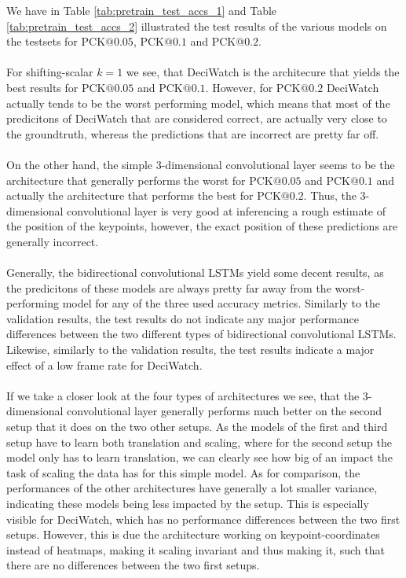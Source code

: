 \documentclass[./main.tex]{subfiles}
\begin{document}
\noindent We have in Table \ref{tab:pretrain_test_accs_1} and Table \ref{tab:pretrain_test_accs_2} illustrated the test results of the various models on the testsets for PCK$@0.05$, PCK$@0.1$ and PCK$@0.2$.
\\
\\
For shifting-scalar $k = 1$ we see, that DeciWatch is the architecure that yields the best results for PCK$@0.05$ and PCK$@0.1$. However, for PCK$@0.2$ DeciWatch actually tends to be the worst performing model, which means that most of the predicitons of DeciWatch that are considered correct, are actually very close to the groundtruth, whereas the predictions that are incorrect are pretty far off.
\\
\\
On the other hand, the simple 3-dimensional convolutional layer seems to be the architecture that generally performs the worst for PCK$@0.05$ and PCK$@0.1$ and actually the architecture that performs the best for PCK$@0.2$. Thus, the 3-dimensional convolutional layer is very good at inferencing a rough estimate of the position of the keypoints, however, the exact position of these predictions are generally incorrect.
\\
\\
Generally, the bidirectional convolutional LSTMs yield some decent results, as the predicitons of these models are always pretty far away from the worst-performing model for any of the three used accuracy metrics. Similarly to the validation results, the test results do not indicate any major performance differences between the two different types of bidirectional convolutional LSTMs. Likewise, similarly to the validation results, the test results indicate a major effect of a low frame rate for DeciWatch. 
\\
\\
If we take a closer look at the four types of architectures we see, that the 3-dimensional convolutional layer generally performs much better on the second setup that it does on the two other setups. As the models of the first and third setup have to learn both translation and scaling, where for the second setup the model only has to learn translation, we can clearly see how big of an impact the task of scaling the data has for this simple model. As for comparison, the performances of the other architectures have generally a lot smaller variance, indicating these models being less impacted by the setup. This is especially visible for DeciWatch, which has no performance differences between the two first setups. However, this is due the architecture working on keypoint-coordinates instead of heatmaps, making it scaling invariant and thus making it, such that there are no differences between the two first setups.
\end{document}
